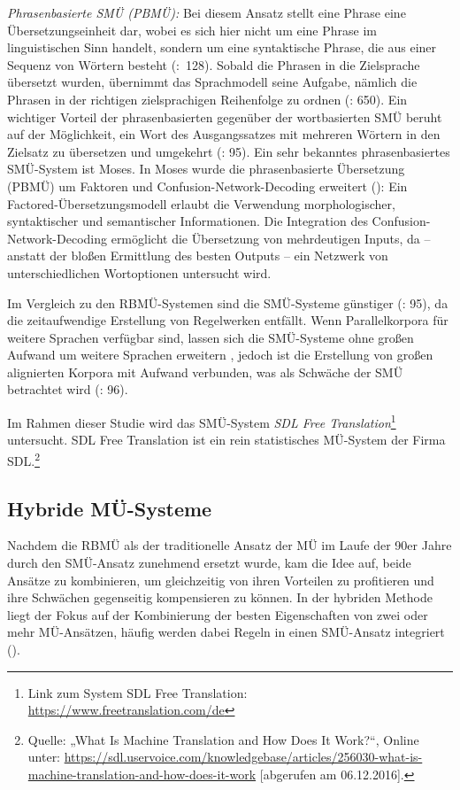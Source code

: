 \textit{Phrasenbasierte SMÜ (PBMÜ):} Bei diesem Ansatz stellt eine Phrase eine Übersetzungseinheit dar, wobei es sich hier nicht um eine Phrase im linguistischen Sinn handelt, sondern um eine syntaktische Phrase, die aus einer Sequenz von Wörtern besteht (\citealt{Köhn2010}:~128). Sobald die Phrasen in die Zielsprache übersetzt wurden, übernimmt das Sprachmodell seine Aufgabe, nämlich die Phrasen in der richtigen zielsprachigen Reihenfolge zu ordnen (\citealt{CarstensenEtAl2010}: 650). Ein wichtiger Vorteil der phrasenbasierten gegenüber der wortbasierten SMÜ beruht auf der Möglichkeit, ein Wort des Ausgangssatzes mit mehreren Wörtern in den Zielsatz zu übersetzen und umgekehrt (\citealt{WerthmannWitt2014}: 95). Ein sehr bekanntes phrasenbasiertes SMÜ-System ist Moses. In Moses wurde die phrasenbasierte Übersetzung (PBMÜ) um Faktoren und Confusion-Network-Decoding erweitert (\citealt{KöhnEtAl2007}): Ein Factored-Übersetzungsmodell erlaubt die Verwendung morphologischer, syntaktischer und semantischer Informationen. Die Integration des Confusion-Network-Decoding ermöglicht die Übersetzung von mehrdeutigen Inputs, da -- anstatt der bloßen Ermittlung des besten Outputs -- ein Netzwerk von unterschiedlichen Wortoptionen untersucht wird.


Im Vergleich zu den RBMÜ-Systemen sind die SMÜ-Systeme günstiger (\citealt{WerthmannWitt2014}: 95), da die zeitaufwendige Erstellung von Regelwerken entfällt. Wenn Parallelkorpora für weitere Sprachen verfügbar sind, lassen sich die SMÜ-Systeme ohne großen Aufwand um weitere Sprachen erweitern \citep{Stein2009}, jedoch ist die Erstellung von großen alignierten Korpora mit Aufwand verbunden, was als Schwäche der SMÜ betrachtet wird (\citealt{WerthmannWitt2014}: 96).

Im Rahmen dieser Studie wird das SMÜ-System \textit{SDL Free Translation}\footnote{{{{Link zum System SDL Free Translation: \url{https://www.freetranslation.com/de}}}}} untersucht. SDL Free Translation ist ein rein statistisches MÜ-System der Firma SDL.\footnote{Quelle: „What Is Machine Translation and How Does It Work?“, Online unter: \url{https://sdl.uservoice.com/knowledgebase/articles/256030-what-is-machine-translation-and-how-does-it-work} [abgerufen am 06.12.2016].}

\subsection{Hybride MÜ-Systeme}
\label{sec:3.2.3}
Nachdem die RBMÜ als der traditionelle Ansatz der MÜ im Laufe der 90er Jahre durch den SMÜ-Ansatz zunehmend ersetzt wurde, kam die Idee auf, beide Ansätze zu kombinieren, um gleichzeitig von ihren Vorteilen zu profitieren und ihre Schwächen gegenseitig kompensieren zu können. In der hybriden Methode liegt der Fokus auf der Kombinierung der besten Eigenschaften von zwei oder mehr MÜ-Ansätzen, häufig werden dabei Regeln in einen SMÜ-Ansatz integriert (\citealt{Costa-JussàFonollosa2015}).

